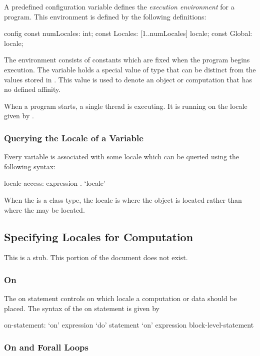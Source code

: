 A predefined configuration variable defines the {\em execution
environment} for a program.  This environment is defined by the
following definitions:
\begin{chapel}
config const numLocales: int;
const Locales: [1..numLocales] locale;
const Global: locale;
\end{chapel}
The environment consists of constants which are fixed when the program
begins execution.  The variable  holds a special value
of  type that can be distinct from the values stored
in . This value is used to denote an object or
computation that has no defined affinity.

When a program starts, a single thread is executing.  It is running on
the locale given by .

\subsubsection{Querying the Locale of a Variable}
\label{Querying_the_Locale_of_a_Variable}

Every variable  is associated with some locale which can be
queried using the following syntax:
\begin{syntax}
locale-access:
  expression . `locale'
\end{syntax}
When the  is a class type, the locale is where the
object is located rather than where the  may be
located.

\subsection{Specifying Locales for Computation}
\label{Specifying_Locales_for_Computation}

This is a stub.  This portion of the document does not exist.

\subsubsection{On}
\label{On}

The on statement controls on which locale a computation or data should
be placed.  The syntax of the on statement is given by
\begin{syntax}
on-statement:
  `on' expression `do' statement
  `on' expression block-level-statement
\end{syntax}

\subsubsection{On and Forall Loops}
\label{On_and_Forall_Loops}

